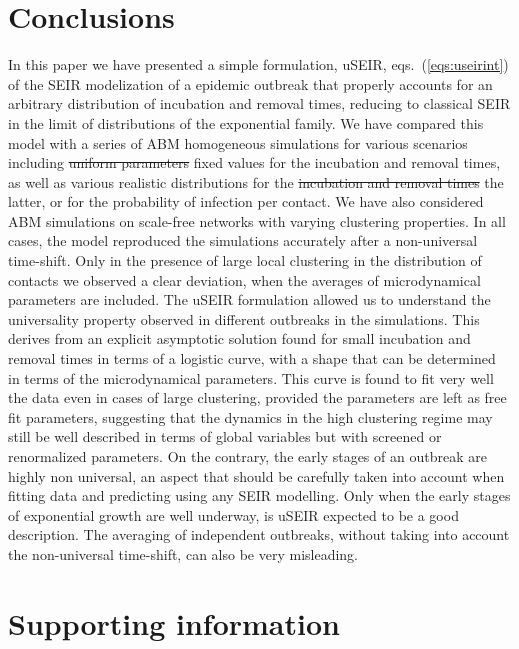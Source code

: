 \documentclass[10pt,letterpaper]{article}
\newcommand{\mychange}[2]{\textcolor[rgb]{0.75,0,0}{\st{#1} {#2}}}
\begin{document}
\section*{Conclusions}
\label{sec:conclu}



In this paper we have presented a simple formulation, uSEIR,  eqs.~(\ref{eqs:useirint}) of the SEIR modelization of a epidemic outbreak that properly accounts for an arbitrary distribution of incubation and removal times, reducing to classical SEIR in the limit of distributions of the exponential family.  We have compared this model with a series of ABM homogeneous simulations for various scenarios including \mychange{uniform parameters}{fixed values for the incubation and removal times}, as well as various realistic distributions for the \mychange{incubation and removal times}{the latter}, or for the probability of infection per contact. We have also considered ABM simulations on scale-free networks with varying 
 clustering properties. In all cases, the model reproduced the simulations accurately after a non-universal time-shift. Only in the presence of large local clustering in the distribution of contacts we observed a clear deviation, when the averages of microdynamical parameters are included. The uSEIR formulation allowed
us to understand the universality property observed in different outbreaks in the simulations. This derives from an explicit asymptotic solution found for small incubation and removal times in terms of a logistic curve, with a shape that can be determined in terms of the microdynamical parameters. This curve is found to fit very well the data  even in cases of large clustering, provided the parameters are left as free fit parameters, suggesting that the dynamics in the high clustering regime may still be well described in terms of global variables but with screened or renormalized parameters. On the contrary, the early stages of an outbreak  are highly non universal, an aspect that should be carefully taken into account when fitting data and predicting using any SEIR modelling. Only  when the early stages of exponential growth are well underway, is uSEIR expected to be a good description. The averaging of independent outbreaks, without taking into account the non-universal time-shift, can also be very misleading.

\section*{Supporting information}
\end{document}
